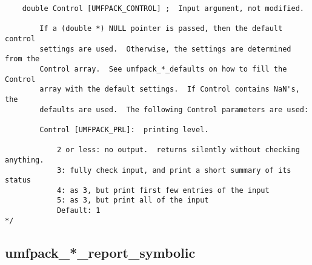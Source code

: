 \documentclass[11pt]{article}
\begin{document}
{\begin{verbatim}
    double Control [UMFPACK_CONTROL] ;  Input argument, not modified.

        If a (double *) NULL pointer is passed, then the default control
        settings are used.  Otherwise, the settings are determined from the
        Control array.  See umfpack_*_defaults on how to fill the Control
        array with the default settings.  If Control contains NaN's, the
        defaults are used.  The following Control parameters are used:

        Control [UMFPACK_PRL]:  printing level.

            2 or less: no output.  returns silently without checking anything.
            3: fully check input, and print a short summary of its status
            4: as 3, but print first few entries of the input
            5: as 3, but print all of the input
            Default: 1
*/
\end{verbatim}
}

\newpage
\subsection{umfpack\_*\_report\_symbolic}
\end{document}
